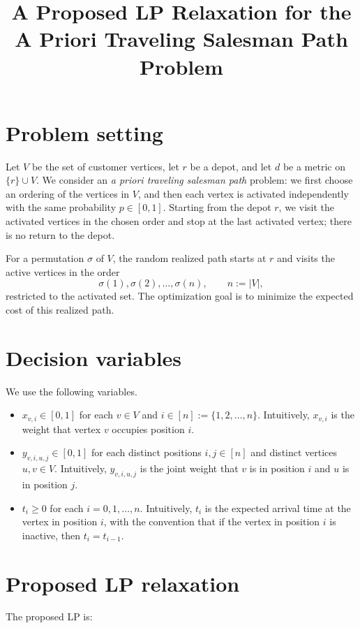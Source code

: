 \documentclass[11pt]{article}
\title{A Proposed LP Relaxation for the A Priori Traveling Salesman Path Problem}
\author{}
\date{}
\begin{document}
\maketitle

\section*{Problem setting}
Let $V$ be the set of customer vertices, let $r$ be a depot, and let $d$ be a metric on $\{r\} \cup V$. We consider an \emph{a priori traveling salesman path} problem: we first choose an ordering of the vertices in $V$, and then each vertex is activated independently with the same probability $p \in [0,1]$. Starting from the depot $r$, we visit the activated vertices in the chosen order and stop at the last activated vertex; there is no return to the depot.

For a permutation $\sigma$ of $V$, the random realized path starts at $r$ and visits the active vertices in the order
\[
\sigma(1),\sigma(2),\dots,\sigma(n), \qquad n := |V|,
\]
restricted to the activated set. The optimization goal is to minimize the expected cost of this realized path.

\section*{Decision variables}
We use the following variables.

\begin{itemize}[leftmargin=1.5em]
    \item $x_{v,i} \in [0,1]$ for each $v \in V$ and $i \in [n] := \{1,2,\dots,n\}$. Intuitively, $x_{v,i}$ is the weight that vertex $v$ occupies position $i$.
    \item $y_{v,i,u,j} \in [0,1]$ for each distinct positions $i,j \in [n]$ and distinct vertices $u,v \in V$. Intuitively, $y_{v,i,u,j}$ is the joint weight that $v$ is in position $i$ and $u$ is in position $j$.
    \item $t_i \ge 0$ for each $i=0,1,\dots,n$. Intuitively, $t_i$ is the expected arrival time at the vertex in position $i$, with the convention that if the vertex in position $i$ is inactive, then $t_i=t_{i-1}$.
\end{itemize}

\section*{Proposed LP relaxation}
The proposed LP is:
\end{document}
